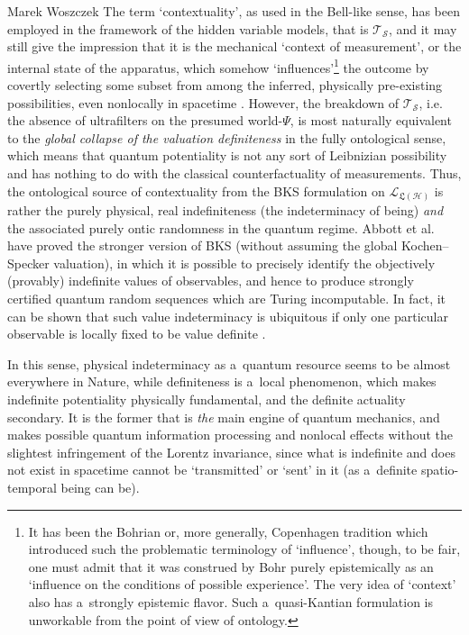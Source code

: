 \begin{artengenv}{Marek Woszczek}
The term ‘contextuality', as used in the Bell-like sense, has been employed in the framework of the hidden variable models, that is $\bm{\mathcal{T}}_{\mathcal{S}}$, and it may still give the impression that it is the mechanical ‘context of measurement', or the internal state of the apparatus, which somehow ‘influences'\footnote{It has been the Bohrian or, more generally, Copenhagen tradition which introduced such the problematic terminology of ‘influence', though, to be fair, one must admit that it was construed by Bohr purely epistemically as an ‘influence on the conditions of possible experience'. The very idea of ‘context' also has a~strongly epistemic flavor. Such a~quasi-Kantian formulation is unworkable from the point of view of ontology. } the outcome by covertly selecting some subset from among the inferred, physically pre-existing possibilities, even nonlocally in spacetime
\parencite[for a~methodic critique see e.g. de][]{de_ronde_unscrambling_2017}. %
 However, the breakdown of $\bm{\mathcal{T}}_{\mathcal{S}}$, i.e. the absence of ultrafilters on the presumed world-$\Psi$, is most naturally equivalent to the \textit{global collapse of the valuation definiteness} in the fully ontological sense, which means that quantum potentiality is not any sort of Leibnizian possibility and has nothing to do with the classical counterfactuality of measurements. Thus, the ontological source of contextuality from the BKS formulation on $\mathcal{L}_{\bm{\mathfrak{L}}(\mathcal{H})}$ is rather the purely physical, real indefiniteness (the indeterminacy of being) \textit{and} the associated purely ontic randomness in the quantum regime. Abbott et al. 
\parencite*[][]{aolita_fully_2012} %
 have proved the stronger version of BKS (without assuming the global Kochen–Specker valuation), in which it is possible to precisely identify the objectively (provably) indefinite values of observables, and hence to produce strongly certified quantum random sequences which are Turing incomputable. In fact, it can be shown that such value indeterminacy is ubiquitous if only one particular observable is locally fixed to be value definite 
\parencite[][]{abbott_value-indefinite_2014}.%


In this sense, physical indeterminacy as a~quantum resource seems to be almost everywhere in Nature, while definiteness is a~local phenomenon, which makes indefinite potentiality physically fundamental, and the definite actuality secondary. It is the former that is \textit{the} main engine of quantum mechanics, and makes possible quantum information processing and nonlocal effects without the slightest infringement of the Lorentz invariance, since what is indefinite and does not exist in spacetime cannot be ‘transmitted' or ‘sent' in it (as a~definite spatio-temporal being can be).


\end{artengenv}
